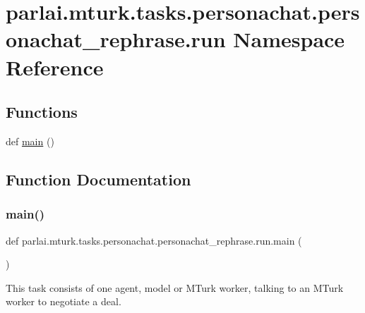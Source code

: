 \hypertarget{namespaceparlai_1_1mturk_1_1tasks_1_1personachat_1_1personachat__rephrase_1_1run}{}\section{parlai.\+mturk.\+tasks.\+personachat.\+personachat\+\_\+rephrase.\+run Namespace Reference}
\label{namespaceparlai_1_1mturk_1_1tasks_1_1personachat_1_1personachat__rephrase_1_1run}
\subsection*{Functions}
\begin{DoxyCompactItemize}
\item 
def \hyperlink{namespaceparlai_1_1mturk_1_1tasks_1_1personachat_1_1personachat__rephrase_1_1run_a91f09d955cf9e1502d8d9882fa7e1f69}{main} ()
\end{DoxyCompactItemize}


\subsection{Function Documentation}
\mbox{\label{namespaceparlai_1_1mturk_1_1tasks_1_1personachat_1_1personachat__rephrase_1_1run_a91f09d955cf9e1502d8d9882fa7e1f69}} 
\subsubsection{\texorpdfstring{main()}{main()}}
{\footnotesize\ttfamily def parlai.\+mturk.\+tasks.\+personachat.\+personachat\+\_\+rephrase.\+run.\+main (\begin{DoxyParamCaption}{ }\end{DoxyParamCaption})}

\begin{DoxyVerb}This task consists of one agent, model or MTurk worker, talking to an MTurk worker
to negotiate a deal.
\end{DoxyVerb}
 